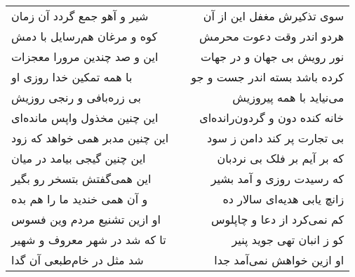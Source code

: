 \begin{center}
\begin{longtable}{l p{0.5cm} r}
شیر و آهو جمع گردد آن زمان
&&
سوی تذکیرش مغفل این از آن
\\
کوه و مرغان هم‌رسایل با دمش
&&
هردو اندر وقت دعوت محرمش
\\
این و صد چندین مرورا معجزات
&&
نور رویش بی جهان و در جهات
\\
با همه تمکین خدا روزی او
&&
کرده باشد بسته اندر جست و جو
\\
بی زره‌بافی و رنجی روزیش
&&
می‌نیاید با همه پیروزیش
\\
این چنین مخذول واپس مانده‌ای
&&
خانه کنده دون و گردون‌رانده‌ای
\\
این چنین مدبر همی خواهد که زود
&&
بی تجارت پر کند دامن ز سود
\\
این چنین گیجی بیامد در میان
&&
که بر آیم بر فلک بی نردبان
\\
این همی‌گفتش بتسخر رو بگیر
&&
که رسیدت روزی و آمد بشیر
\\
و آن همی خندید ما را هم بده
&&
زانچ یابی هدیه‌ای سالار ده
\\
او ازین تشنیع مردم وین فسوس
&&
کم نمی‌کرد از دعا و چاپلوس
\\
تا که شد در شهر معروف و شهیر
&&
کو ز انبان تهی جوید پنیر
\\
شد مثل در خام‌طبعی آن گدا
&&
او ازین خواهش نمی‌آمد جدا
\\
\end{longtable}
\end{center}
